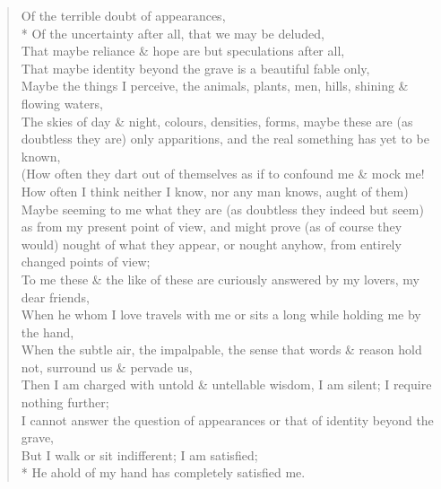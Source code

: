\documentclass[MAIN]{subfiles}
\begin{document}
\begin{verse}
Of the terrible doubt of appearances,\\*
Of the uncertainty after all, that we may be deluded,\\
That maybe reliance \& hope are but speculations after all,\\
That maybe identity beyond the grave is a beautiful fable only,\\
Maybe the things I perceive, the animals, plants, men, hills, shining \& flowing waters,\\
The skies of day \& night, colours, densities, forms, maybe these are (as doubtless they are) only apparitions, and the real something has yet to be known,\\
(How often they dart out of themselves as if to confound me \& mock me!\\
How often I think neither I know, nor any man knows, aught of them)\\
Maybe seeming to me what they are (as doubtless they indeed but seem) as from my present point of view, and might prove (as of course they would) nought of what they appear, or nought anyhow, from entirely changed points of view;\\
To me these \& the like of these are curiously answered by my lovers, my dear friends,\\
When he whom I love travels with me or sits a long while holding me by the hand,\\
When the subtle air, the impalpable, the sense that words \& reason hold not, surround us \& pervade us,\\ 
Then I am charged with untold \& untellable wisdom, I am silent; I require nothing further;\\
I cannot answer the question of appearances or that of identity beyond the grave,\\
But I walk or sit indifferent; I am satisfied;\\*
He ahold of my hand has completely satisfied me.
\end{verse}
\end{document}
